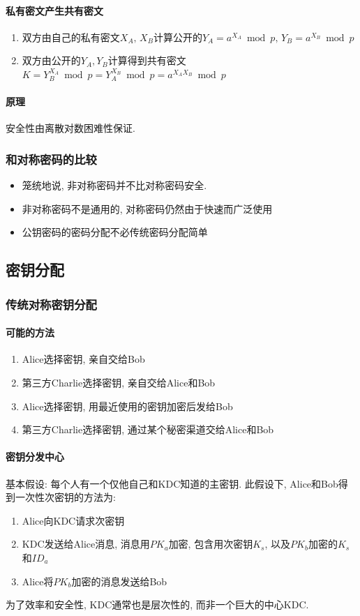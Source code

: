 \documentclass{ctexart}
\begin{document}
\paragraph{私有密文产生共有密文}
    \begin{enumerate}
        \item 双方由自己的私有密文$X_A,\, X_B$计算公开的$Y_A = a^{X_A} \bmod p,\, Y_B = a^{X_B} \bmod p$
        \item 双方由公开的$Y_A, Y_B$计算得到共有密文$K = Y_B^{X_A} \bmod p = Y_A^{X_B} \bmod p = a^{X_A X_B} \bmod p$
    \end{enumerate}
\paragraph{原理}
    安全性由离散对数困难性保证.
\subsubsection{和对称密码的比较}
    \begin{itemize}
        \item 笼统地说, 非对称密码并不比对称密码安全.
        \item 非对称密码不是通用的, 对称密码仍然由于快速而广泛使用
        \item 公钥密码的密码分配不必传统密码分配简单
    \end{itemize}

\subsection{密钥分配}
\subsubsection{传统对称密钥分配}
\paragraph{可能的方法}
    \begin{enumerate}
        \item Alice选择密钥, 亲自交给Bob
        \item 第三方Charlie选择密钥, 亲自交给Alice和Bob
        \item Alice选择密钥, 用最近使用的密钥加密后发给Bob
        \item 第三方Charlie选择密钥, 通过某个秘密渠道交给Alice和Bob
    \end{enumerate}
\paragraph{密钥分发中心}
    基本假设: 每个人有一个仅他自己和KDC知道的主密钥. 此假设下, Alice和Bob得到一次性次密钥的方法为:
    \begin{enumerate}
        \item Alice向KDC请求次密钥
        \item KDC发送给Alice消息, 消息用$PK_a$加密, 包含用次密钥$K_s$, 以及$PK_b$加密的$K_s$和$ID_a$
        \item Alice将$PK_b$加密的消息发送给Bob
    \end{enumerate}
    为了效率和安全性, KDC通常也是层次性的, 而非一个巨大的中心KDC.
\end{document}
